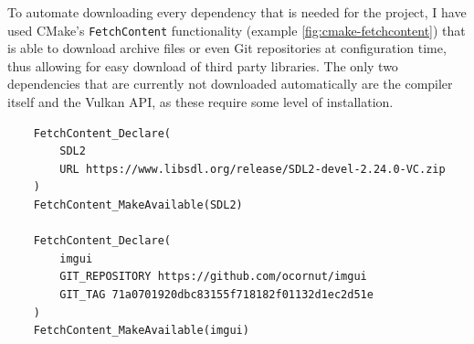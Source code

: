 To automate downloading every dependency that is needed for the project, I have used CMake's \verb|FetchContent| functionality (example \autoref{fig:cmake-fetchcontent}) that is able to download archive files or even Git repositories at configuration time, thus allowing for easy download of third party libraries. The only two dependencies that are currently not downloaded automatically are the compiler itself and the Vulkan API, as these require some level of installation.

\begin{listing}
    \begin{verbatim}
    FetchContent_Declare(
        SDL2
        URL https://www.libsdl.org/release/SDL2-devel-2.24.0-VC.zip
    )
    FetchContent_MakeAvailable(SDL2)

    FetchContent_Declare(
        imgui
        GIT_REPOSITORY https://github.com/ocornut/imgui
        GIT_TAG 71a0701920dbc83155f718182f01132d1ec2d51e
    )
    FetchContent_MakeAvailable(imgui)
    \end{verbatim}
    \caption{Example of using \texttt{FetchContent} to download dependencies}
    \label{fig:cmake-fetchcontent}
\end{listing}



